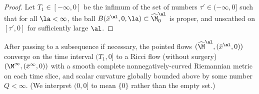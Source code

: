 \begin{proof}

Let $T_1 \in [-\infty,0]$ be the infimum of the set of numbers
$\tau'\in (-\infty,0]$ such that for all $\la<\infty$,
the ball $B(\bar x^\al,0,\la)\subset\widehat\M^\al_0$
is proper,
and unscathed on $[\tau',0]$ for sufficiently
large $\al$.

\end{proof}
\begin{lemma}
  \label{lem:kl-construction-ricci-flow-surgery-convergence-ricci-flow-surgery}
 \label{bdrysmoothness}
After passing to a subsequence
if necessary, the pointed flows  $(\widehat\M^\al,(\bar x^\al,0))$
converge on the time interval $(T_1, 0]$ to a Ricci flow (without
surgery) $(\M^\infty,(\bar x^\infty,0))$ with
a smooth complete nonnegatively-curved Riemannian metric
on each time slice, and
scalar curvature globally bounded above by
some number $Q<\infty$.
(We interpret $(0, 0]$ to mean $\{0\}$ rather than the
empty set.)
\end{lemma}
